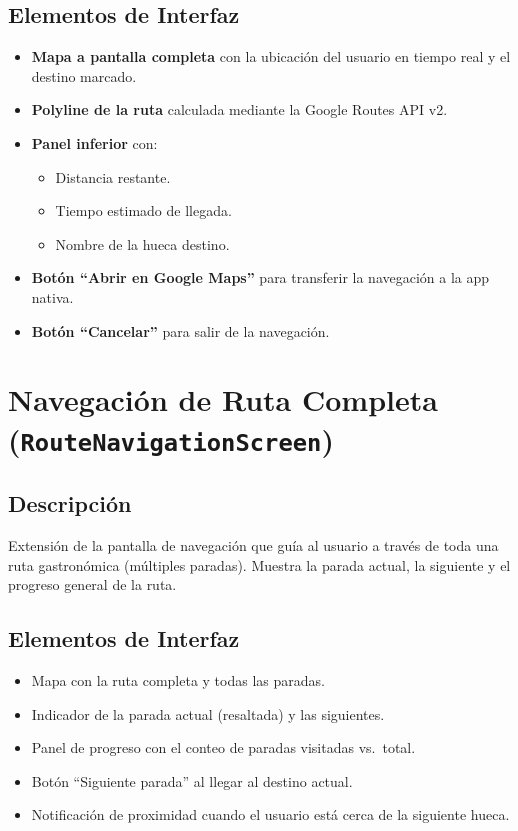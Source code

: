 \documentclass[11pt, a4paper, oneside]{report}
\begin{document}
\subsection{Elementos de Interfaz}
\begin{itemize}
  \item \textbf{Mapa a pantalla completa} con la ubicación del usuario en tiempo real y el destino marcado.
  \item \textbf{Polyline de la ruta} calculada mediante la Google Routes API v2.
  \item \textbf{Panel inferior} con:
  \begin{itemize}
    \item Distancia restante.
    \item Tiempo estimado de llegada.
    \item Nombre de la hueca destino.
  \end{itemize}
  \item \textbf{Botón ``Abrir en Google Maps''} para transferir la navegación a la app nativa.
  \item \textbf{Botón ``Cancelar''} para salir de la navegación.
\end{itemize}

\section{Navegación de Ruta Completa (\texttt{RouteNavigationScreen})}

\subsection{Descripción}
Extensión de la pantalla de navegación que guía al usuario a través de toda una ruta gastronómica (múltiples paradas). Muestra la parada actual, la siguiente y el progreso general de la ruta.

\subsection{Elementos de Interfaz}
\begin{itemize}
  \item Mapa con la ruta completa y todas las paradas.
  \item Indicador de la parada actual (resaltada) y las siguientes.
  \item Panel de progreso con el conteo de paradas visitadas vs.\ total.
  \item Botón ``Siguiente parada'' al llegar al destino actual.
  \item Notificación de proximidad cuando el usuario está cerca de la siguiente hueca.
\end{itemize}
\end{document}
